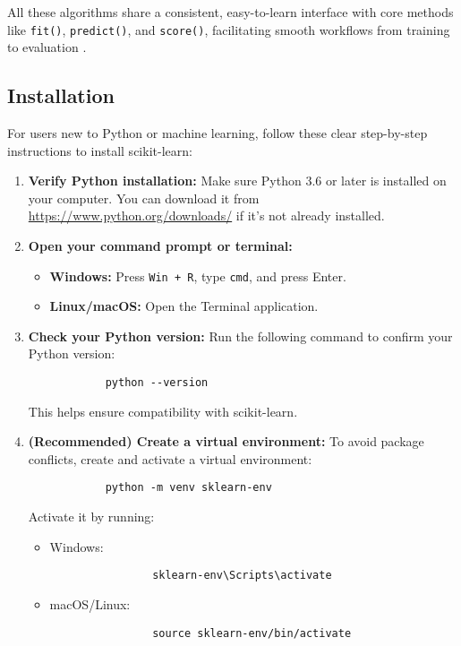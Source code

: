 All these algorithms share a consistent, easy-to-learn interface with core methods like \texttt{fit()}, \texttt{predict()}, and \texttt{score()}, facilitating smooth workflows from training to evaluation \cite{pedregosa2011scikitlearn}.

\subsection{Installation}
For users new to Python or machine learning, follow these clear step-by-step instructions to install scikit-learn:

\begin{enumerate}
	\item \textbf{Verify Python installation:}  
	Make sure Python 3.6 or later is installed on your computer. You can download it from \url{https://www.python.org/downloads/} if it’s not already installed.
	
	\item \textbf{Open your command prompt or terminal:}
	\begin{itemize}
		\item \textbf{Windows:} Press \texttt{Win + R}, type \texttt{cmd}, and press Enter.
		\item \textbf{Linux/macOS:} Open the Terminal application.
	\end{itemize}
	
	\item \textbf{Check your Python version:}  
	Run the following command to confirm your Python version:
	\begin{framed}
		\begin{verbatim}
			python --version
		\end{verbatim}
	\end{framed}
	This helps ensure compatibility with scikit-learn.
	
	\item \textbf{(Recommended) Create a virtual environment:}  
	To avoid package conflicts, create and activate a virtual environment:
	\begin{framed}
		\begin{verbatim}
			python -m venv sklearn-env
		\end{verbatim}
	\end{framed}
	Activate it by running:
	\begin{itemize}
		\item Windows:
		\begin{framed}
			\begin{verbatim}
				sklearn-env\Scripts\activate
			\end{verbatim}
		\end{framed}
		\item macOS/Linux:
		\begin{framed}
			\begin{verbatim}
				source sklearn-env/bin/activate
			\end{verbatim}
		\end{framed}
	\end{itemize}
	

\end{enumerate}
